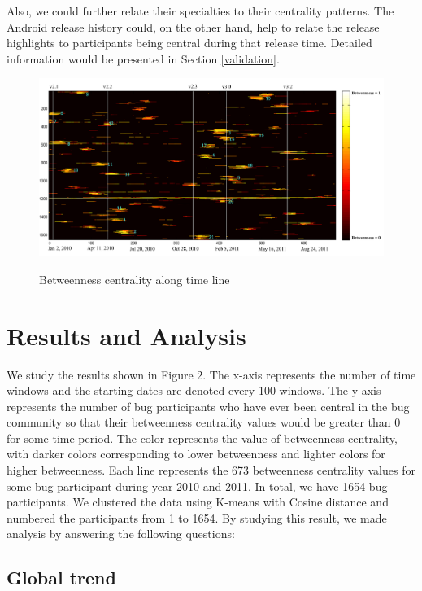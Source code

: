 \documentclass[10pt, conference, compsocconf]{IEEEtran}
\begin{document}
Also, we could further relate their specialties to their centrality patterns. The Android release history could, on the other hand, help to relate the release highlights to participants being central during that release time. Detailed information would be presented in Section \ref{validation}. 

\begin{figure}[ht]
\centering
\includegraphics[width=18cm]{result.pdf}
\label{result}
\caption{Betweenness centrality along time line}
\end{figure}

\section{Results and Analysis}
\label{results}
We study the results shown in Figure 2. The x-axis represents the number of time windows and the starting dates are denoted every 100 windows. The y-axis represents the number of bug participants who have ever been central in the bug community so that their betweenness centrality values would be greater than 0 for some time period. The color represents the value of betweenness centrality, with darker colors corresponding to lower betweenness and lighter colors for higher betweenness. Each line represents the 673 betweenness centrality values for some bug participant during year 2010 and 2011. In total, we have 1654 bug participants. We clustered the data using K-means with Cosine distance and numbered the participants from 1 to 1654. By studying this result, we made analysis by answering the following questions:

\subsection{Global trend}
\end{document}
